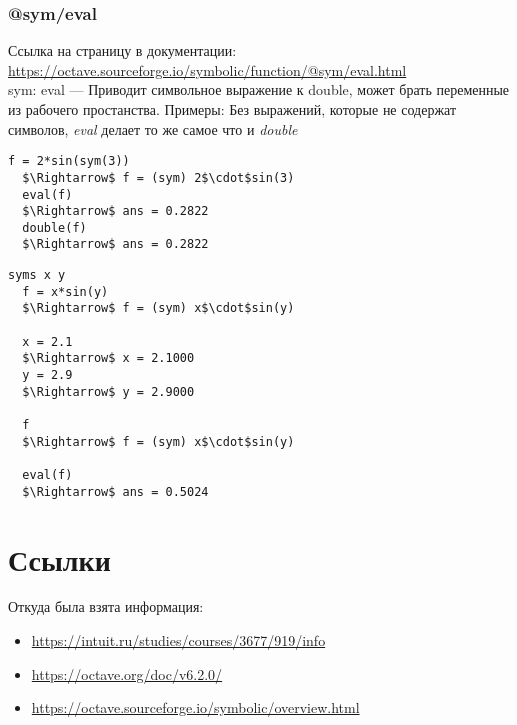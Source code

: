 \documentclass[12pt, a4paper,oneside]{book}
\begin{document}
\subsection{@sym/eval} \label{sec:sym/eval}
Ссылка на страницу в  документации: \url{https://octave.sourceforge.io/symbolic/function/@sym/eval.html}\\
sym: eval --- Приводит символьное выражение к double, может брать переменные из рабочего простанства. Примеры:
Без выражений, которые не содержат символов, \textit{eval} делает то же самое что и \textit{double}
\begin{lstlisting}[mathescape]
  f = 2*sin(sym(3))
  $\Rightarrow$ f = (sym) 2$\cdot$sin(3)
  eval(f)
  $\Rightarrow$ ans = 0.2822
  double(f)
  $\Rightarrow$ ans = 0.2822
\end{lstlisting}

\begin{lstlisting}[mathescape]
  syms x y
  f = x*sin(y)
  $\Rightarrow$ f = (sym) x$\cdot$sin(y)

  x = 2.1
  $\Rightarrow$ x = 2.1000
  y = 2.9
  $\Rightarrow$ y = 2.9000

  f
  $\Rightarrow$ f = (sym) x$\cdot$sin(y)

  eval(f)
  $\Rightarrow$ ans = 0.5024
\end{lstlisting}

\chapter{Ссылки}
Откуда была взята информация:
\begin{itemize}
  \item{\url{https://intuit.ru/studies/courses/3677/919/info}}
  \item{\url{https://octave.org/doc/v6.2.0/}}
  \item{\url{https://octave.sourceforge.io/symbolic/overview.html}}
\end{itemize}
\end{document}
